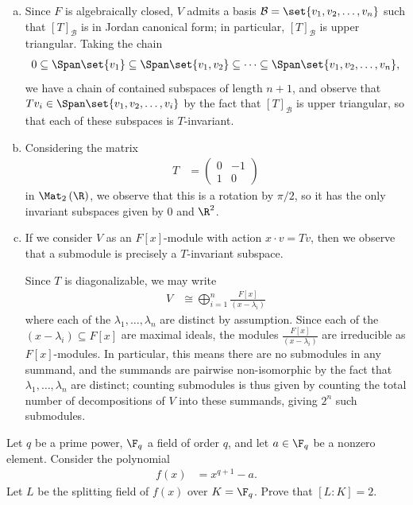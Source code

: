 \documentclass[10pt]{mypackage}
\begin{document}
\begin{solution}\hfill
  \begin{enumerate}[(a)]
    \item Since $F$ is algebraically closed, $V$ admits a basis $ \mathcal{B} = \set{v_1,v_2,\dots,v_n} $ such that $\left[ T \right]_{\mathcal{B}}$ is in Jordan canonical form; in particular, $\left[ T \right]_{\mathcal{B}}$ is upper triangular. Taking the chain
      \begin{align*}
        0 \subseteq \Span\set{v_1}\subseteq \Span\set{v_1,v_2}\subseteq\cdots\subseteq \Span\set{v_1,v_2,\dots,v_n},
      \end{align*}
      we have a chain of contained subspaces of length $n+1$, and observe that $Tv_i\in \Span\set{v_1,v_2,\dots,v_i}$ by the fact that $\left[ T \right]_{\mathcal{B}}$ is upper triangular, so that each of these subspaces is $T$-invariant.
    \item Considering the matrix
      \begin{align*}
        T &= \begin{pmatrix}0 & -1 \\ 1 & 0\end{pmatrix}
      \end{align*}
      in $\Mat_2\left( \R \right)$, we observe that this is a rotation by $\pi/2$, so it has the only invariant subspaces given by $0$ and $\R^2$.
    \item If we consider $V$ as an $F[x]$-module with action $x\cdot v = Tv$, then we observe that a submodule is precisely a $T$-invariant subspace.

      Since $T$ is diagonalizable, we may write
      \begin{align*}
        V &\cong \bigoplus_{i=1}^{n} \frac{F[x]}{\left( x-\lambda_i \right)}
      \end{align*}
      where each of the $\lambda_1,\dots,\lambda_n$ are distinct by assumption. Since each of the $\left( x-\lambda_i \right)\subseteq F[x]$ are maximal ideals, the modules $\frac{F[x]}{\left( x-\lambda_i \right)}$ are irreducible as $F[x]$-modules. In particular, this means there are no submodules in any summand, and the summands are pairwise non-isomorphic by the fact that $\lambda_1,\dots,\lambda_n$ are distinct; counting submodules is thus given by counting the total number of decompositions of $V$ into these summands, giving $2^{n}$ such submodules.
  \end{enumerate}
\end{solution}
\begin{problem}[Problem 8]
  Let $q$ be a prime power, $\F_q$ a field of order $q$, and let $a\in \F_q$ be a nonzero element. Consider the polynomial
  \begin{align*}
    f(x) &= x^{q+1} - a.
  \end{align*}
  Let $L$ be the splitting field of $f(x)$ over $K = \F_q$. Prove that $\left[ L:K \right] = 2$.
\end{problem}
\end{document}

